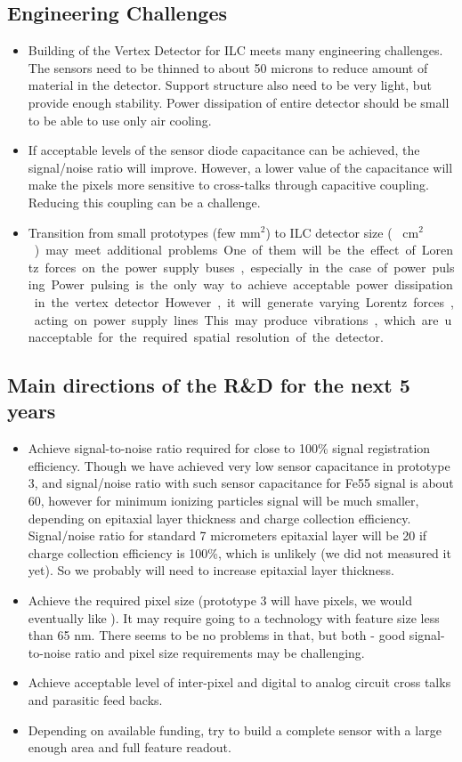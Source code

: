 \subsection{Engineering Challenges}
\begin{itemize}
    \item Building of the Vertex Detector for ILC meets many engineering challenges. The sensors need to be thinned to about 50 microns to reduce amount of material in the detector. Support structure also need to be very light, but provide enough stability. Power dissipation of entire detector should be small to be able to use only air cooling.
    \item If acceptable levels of the sensor diode capacitance can be achieved, the signal/noise ratio will improve. However, a lower value of the capacitance will make the pixels more sensitive to cross-talks through capacitive coupling. Reducing this coupling can be a challenge.
    \item Transition from small prototypes (few $\text{mm}^{2}$) to ILC detector size (~ \unit[10]{$\text{cm}^2$}) may meet additional problems. One of them will be the effect of Lorentz forces on the power supply buses, especially in the case of power pulsing. Power pulsing is the only way to achieve acceptable power dissipation in the vertex detector. However, it will generate varying Lorentz forces, acting on power supply lines. This may produce vibrations, which are unacceptable for the required spatial resolution of the detector.
\end{itemize}

\subsection{Main directions of the R\&D for the next 5 years}
\begin{itemize}
    \item Achieve signal-to-noise ratio required for close to 100\% signal registration efficiency. Though we have achieved very low sensor capacitance in prototype 3, and signal/noise ratio with such sensor capacitance for Fe55 signal is about 60, however for minimum ionizing particles signal will be much smaller, depending on epitaxial layer thickness and charge collection efficiency. Signal/noise ratio for standard 7 micrometers epitaxial layer will be 20 if charge collection efficiency is 100\%, which is unlikely (we did not measured it yet). So we probably will need to increase epitaxial layer thickness.
    \item Achieve the required pixel size (prototype 3 will have \unit[25]{\micron} pixels, we would eventually like \unit[15]{\micron}). It may require going to a technology with feature size less than 65 nm. There seems to be no problems in that, but both - good signal-to-noise ratio and pixel size requirements may be challenging.
    \item Achieve acceptable level of inter-pixel and digital to analog circuit cross talks and parasitic feed backs.
    \item Depending on available funding, try to build a complete sensor with a large enough area and full feature readout.
\end{itemize}
